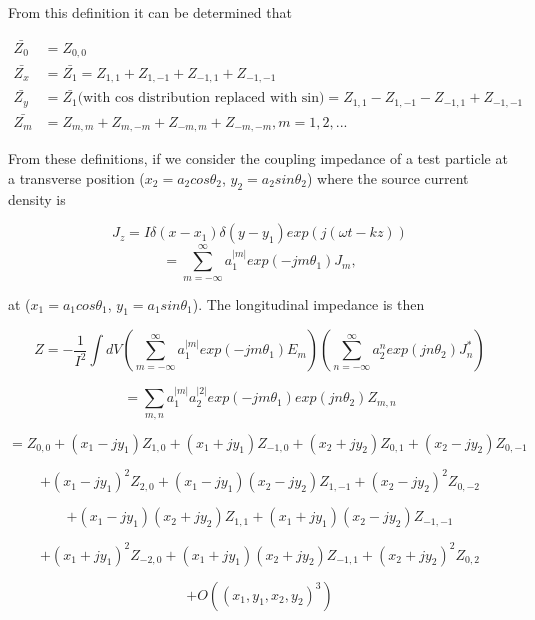 From this definition it can be determined that

\begin{eqnarray}
\bar{Z_{0}} &= Z_{0,0} \\
\bar{Z_{x}} &= \bar{Z_{1}} = Z_{1,1} + Z_{1,-1} + Z_{-1,1} + Z_{-1,-1} \\
\bar{Z_{y}} &= \bar{Z_{1}} \text{(with cos distribution replaced with sin)} = Z_{1,1} - Z_{1,-1} - Z_{-1,1} + Z_{-1,-1} \\
\bar{Z_{m}} &= Z_{m,m} + Z_{m,-m} + Z_{-m,m} + Z_{-m,-m}, m=1,2,...
\end{eqnarray}

From these definitions, if we consider the coupling impedance of a test particle at a transverse position ($x_{2} = a_{2}cos\theta_{2}$, $y_{2}=a_{2}sin\theta_{2}$) where the source current density is

\begin{equation}
J_{z} = I\delta(x-x_{1})\delta(y-y_{1})exp(j(\omega{}t-kz))
\end{equation}
\begin{equation}
= \sum^{\infty}_{m=-\infty}a_{1}^{|m|}exp(-jm\theta_{1})J_{m},
\end{equation}

at ($x_{1} = a_{1}cos\theta_{1}$, $y_{1}=a_{1}sin\theta_{1}$). The longitudinal impedance is then
\begin{flushright}
\begin{equation*}
Z = -\frac{1}{I^{2}} \int dV \left(\sum^{\infty}_{m =-\infty} a^{|m|}_{1} exp(-jm\theta_{1})E_{m}\right)\left(\sum^{\infty}_{n=-\infty} a_{2}^{n}exp(jn\theta_{2})J_{n}^{*}\right)
\end{equation*}

\begin{equation*}
=\sum_{m,n}a_{1}^{|m|}a_{2}^{|2|}exp(-jm\theta_{1})exp(jn\theta_{2})Z_{m,n}
\end{equation*}

\begin{equation*}
=Z_{0,0}+(x_{1}-jy_{1})Z_{1,0}+(x_{1}+jy_{1})Z_{-1,0}+(x_{2}+jy_{2})Z_{0,1}+(x_{2}-jy_{2})Z_{0,-1}
\end{equation*}

\begin{equation*}
+(x_{1}-jy_{1})^{2}Z_{2,0}+(x_{1}-jy_{1})(x_{2}-jy_{2})Z_{1,-1} + (x_2-jy_{2})^{2}Z_{0,-2}
\end{equation*}

\begin{equation*}
+(x_{1}-jy_{1})(x_{2}+jy_{2})Z_{1,1}+(x_{1}+jy_{1})(x_{2}-jy_{2})Z_{-1,-1}
\end{equation*}

\begin{equation*}
+(x_{1}+jy_{1})^{2}Z_{-2,0}+(x_{1}+jy_{1})(x_{2}+jy_{2})Z_{-1,1}+(x_{2}+jy_{2})^{2}Z_{0,2}
\end{equation*}

\begin{equation}
+O\left((x_{1},y_{1},x_{2},y_{2})^{3}\right)
\end{equation}
\end{flushright}


